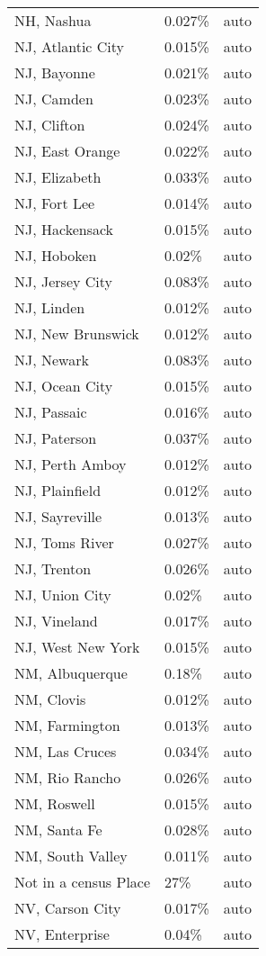 \begin{longtable}[]{@{}lll@{}}
NH, Nashua & 0.027\% & auto \\
NJ, Atlantic City & 0.015\% & auto \\
NJ, Bayonne & 0.021\% & auto \\
NJ, Camden & 0.023\% & auto \\
NJ, Clifton & 0.024\% & auto \\
NJ, East Orange & 0.022\% & auto \\
NJ, Elizabeth & 0.033\% & auto \\
NJ, Fort Lee & 0.014\% & auto \\
NJ, Hackensack & 0.015\% & auto \\
NJ, Hoboken & 0.02\% & auto \\
NJ, Jersey City & 0.083\% & auto \\
NJ, Linden & 0.012\% & auto \\
NJ, New Brunswick & 0.012\% & auto \\
NJ, Newark & 0.083\% & auto \\
NJ, Ocean City & 0.015\% & auto \\
NJ, Passaic & 0.016\% & auto \\
NJ, Paterson & 0.037\% & auto \\
NJ, Perth Amboy & 0.012\% & auto \\
NJ, Plainfield & 0.012\% & auto \\
NJ, Sayreville & 0.013\% & auto \\
NJ, Toms River & 0.027\% & auto \\
NJ, Trenton & 0.026\% & auto \\
NJ, Union City & 0.02\% & auto \\
NJ, Vineland & 0.017\% & auto \\
NJ, West New York & 0.015\% & auto \\
NM, Albuquerque & 0.18\% & auto \\
NM, Clovis & 0.012\% & auto \\
NM, Farmington & 0.013\% & auto \\
NM, Las Cruces & 0.034\% & auto \\
NM, Rio Rancho & 0.026\% & auto \\
NM, Roswell & 0.015\% & auto \\
NM, Santa Fe & 0.028\% & auto \\
NM, South Valley & 0.011\% & auto \\
Not in a census Place & 27\% & auto \\
NV, Carson City & 0.017\% & auto \\
NV, Enterprise & 0.04\% & auto \\

\end{longtable}
